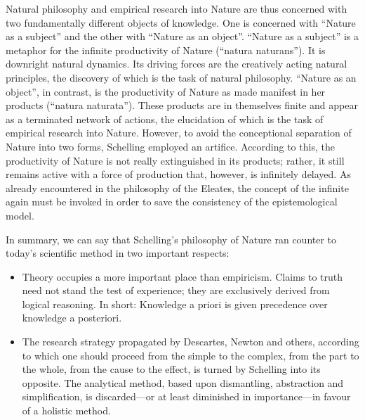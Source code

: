 \documentclass[10pt]{article}
\begin{document}
            \begin{qt}
                Natural philosophy and empirical research into Nature are thus concerned with two fundamentally different objects of knowledge. One is concerned with “Nature as a subject” and the other with “Nature as an object”. “Nature as a subject” is a metaphor for the infinite productivity of Nature (“natura naturans”). It is downright natural dynamics. Its driving forces are the creatively acting natural principles, the discovery of which is the task of natural philosophy. “Nature as an object”, in contrast, is the productivity of Nature as made manifest in her products (“natura naturata”). These products are in themselves finite and appear as a terminated network of actions, the elucidation of which is the task of empirical research into Nature. However, to avoid the conceptional separation of Nature into two forms, Schelling employed an artifice. According to this, the productivity of Nature is not really extinguished in its products; rather, it still remains active with a force of production that, however, is infinitely delayed. As already encountered in the philosophy of the Eleates, the concept of the infinite again must be invoked in order to save the consistency of the epistemological model.
            \end{qt}
            In summary, we can say that Schelling's philosophy of Nature ran counter to today's scientific method in two important respects: \begin{itemize}
                \item Theory occupies a more important place than empiricism. Claims to truth need not stand the test of experience; they are exclusively derived from logical reasoning. In short: Knowledge a priori is given precedence over knowledge a posteriori.
                \item The research strategy propagated by Descartes, Newton and others, according to which one should proceed from the simple to the complex, from the part to the whole, from the cause to the effect, is turned by Schelling into its opposite. The analytical method, based upon dismantling, abstraction and simplification, is discarded—or at least diminished in importance—in favour of a holistic method.
            \end{itemize}
\end{document}
